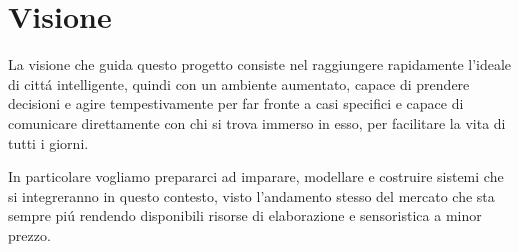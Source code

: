 \section{Visione}

La visione che guida questo progetto consiste nel raggiungere rapidamente l'ideale di citt\'a intelligente, quindi con un ambiente aumentato, capace di prendere decisioni e agire tempestivamente per far fronte a casi specifici e capace di comunicare direttamente con chi si trova immerso in esso, per facilitare la vita di tutti i giorni. 

In particolare vogliamo prepararci ad imparare, modellare e costruire sistemi che si integreranno in questo contesto, visto l'andamento stesso del mercato che sta sempre pi\'u rendendo disponibili risorse di elaborazione e sensoristica a minor prezzo.
